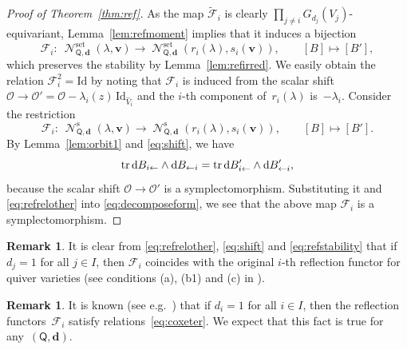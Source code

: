 \documentclass[11pt]{article}
\newcommand{\shortleftarrow}{\leftarrow}
\newcommand{\slar}{\shortleftarrow}
\numberwithin{equation}{section}
\theoremstyle{definition}
\newtheorem{Remark}[Theorem]{Remark}
\newcommand{\thmref}[1]{Theo\-rem~\ref{#1}}
\newcommand{\lemref}[1]{Lemma~\ref{#1}}
\newcommand{\tr}{\operatorname{tr}}
\newcommand{\unit}{\mathrm{Id}}
\newcommand{\bv}{\mathbf{v}}
\newcommand{\ved}{\mathbf{d}}
\newcommand{\bO}{\mathcal{O}}
\newcommand{\Qst}{\operatorname{\mathscr{N}}^\mathrm{s}}
\newcommand{\Qset}{\operatorname{\mathscr{N}}^\mathrm{set}}
\newcommand{\QQ}{\mathsf{Q}} %
\newcommand{\frF}{\mathscr{F}} %
\newcommand{\rd}{\mathop{\mathrm{d}\!}\mathstrut}
\begin{document}
\begin{proof}[Proof of \thmref{thm:ref}]
As the map $\widetilde{\frF}_i$ is clearly
$\prod\limits_{j \neq i}G_{d_j}(V_j)$-equivariant,
\lemref{lem:refmoment} implies
that it induces a bijection
\[
\frF_i \colon \  \Qset_{\QQ,\ved}(\lambda,\bv) \to \Qset_{\QQ,\ved}(r_i(\lambda),s_i(\bv)),
\qquad [B] \mapsto [B'],
\]
which preserves the stability by \lemref{lem:refirred}.
We easily obtain the relation $\frF_i^2 = \unit$
by noting that $\frF_i$ is induced from the scalar shift
$\bO \to \bO'=\bO -\lambda_i(z)\,\unit_{\widehat{V}_i}$
and the $i$-th component of~$r_i(\lambda)$ is~$-\lambda_i$.
Consider the restriction
\[
\frF_i \colon \ \Qst_{\QQ,\ved}(\lambda,\bv) \to \Qst_{\QQ,\ved}(r_i(\lambda),s_i(\bv)),
\qquad [B] \mapsto [B'].
\]
By \lemref{lem:orbit1} and \eqref{eq:shift},
we have
\[
\tr \rd B_{i \slar} \wedge \rd B_{\slar i} =
\tr \rd B'_{i \slar} \wedge \rd B'_{\slar i},
\]
because the scalar shift
$\bO \to \bO'$
is a symplectomorphism.
Substituting it and \eqref{eq:refrelother}
into \eqref{eq:decomposeform},
we see that the above map $\frF_i$
is a symplectomorphism.
\end{proof}

\begin{Remark}\label{rem:original-ref}
It is clear from \eqref{eq:refrelother}, \eqref{eq:shift}
and \eqref{eq:refstability} that if $d_j=1$ for all $j \in I$,
then $\frF_i$ coincides with the original $i$-th ref\/lection functor
for quiver varieties
(see conditions (a), (b1) and (c) in \cite[Section 3]{MR1623674}).
\end{Remark}

\begin{Remark}\label{rem:ref-relation}
It is known (see e.g.\ \cite{MR1775358}) that if $d_i=1$ for all $i \in I$,
then the ref\/lection functors~$\frF_i$ satisfy relations~\eqref{eq:coxeter}.
We expect that this fact is true for any~$(\QQ,\ved)$.
\end{Remark}
\end{document}
